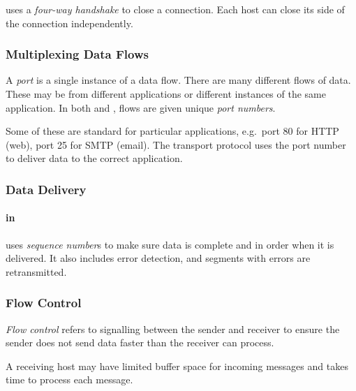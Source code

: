 \begin{definition}\label{def:TCP_4_Way_Handshake}
   uses a \emph{four-way handshake} to close a connection.
  Each host can close its side of the connection independently.
\end{definition}

\subsubsection{Multiplexing Data Flows}\label{subsubsec:Multiplexing_Data_Flows}
\begin{definition}[Port]\label{def:Port}
  A \emph{port} is a single instance of a data flow.
  There are many different flows of data.
  These may be from different applications or different instances of the same application.
  In both  and , flows are given unique \emph{port numbers}.

  Some of these are standard for particular applications, e.g.\ port 80 for HTTP (web), port 25 for SMTP (email).
  The transport protocol uses the port number to deliver data to the correct application.
\end{definition}

\subsubsection{Data Delivery}\label{subsubsec:Data_Delivery}
\paragraph{ in }\label{par:TCP_Data_Delivery}
\begin{definition}\label{def:Sequence_Number}
   uses \emph{sequence number}s to make sure data is complete and in order when it is delivered.
  It also includes error detection, and segments with errors are retransmitted.
\end{definition}

\subsubsection{Flow Control}\label{subsubsec:Flow_Control}
\begin{definition}\label{def:Flow_Control}
  \emph{Flow control} refers to signalling between the sender and receiver to ensure the sender does not send data faster than the receiver can process.

  A receiving host may have limited buffer space for incoming messages and takes time to process each message.
\end{definition}

